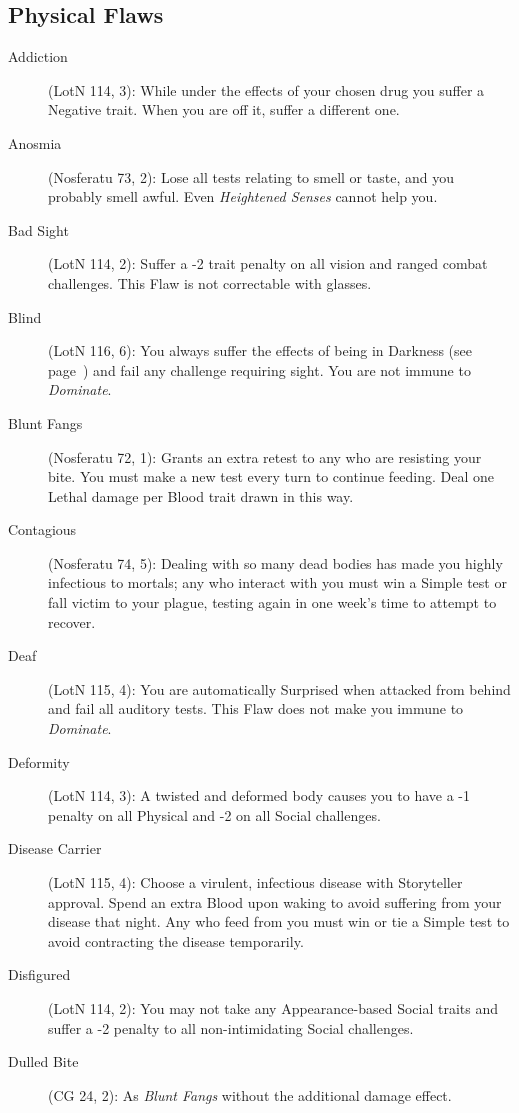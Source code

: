\subsection{Physical Flaws}
\begin{description}
	\item[Addiction] (LotN 114, 3):  While under the effects of your chosen drug you 
	suffer a Negative trait.  When you are off it, suffer a different one.
	\item[Anosmia] (Nosferatu 73, 2):  Lose all tests relating to smell or taste, and 
	you probably smell awful.  Even \emph{Heightened Senses} cannot help you.
	\item[Bad Sight] (LotN 114, 2):  Suffer a -2 trait penalty on all vision and ranged 
	combat challenges.  This Flaw is not correctable with glasses.
	\item[Blind] (LotN 116, 6):  You always suffer the effects of being in Darkness (see 
	page~\pageref{sec:challenges}) and fail any challenge requiring sight.  You are not 
	immune to \emph{Dominate}.
	\item[Blunt Fangs] (Nosferatu 72, 1):  Grants an extra retest to any who are resisting your 
	bite.  You must make a new test every turn to continue feeding.  Deal one Lethal damage per 
	Blood trait drawn in this way.
	\item[Contagious] (Nosferatu 74, 5):  Dealing with so many dead bodies has made you 
	highly infectious to mortals; any who interact with you must win a Simple test or fall 
	victim to your plague, testing again in one week's time to attempt to recover.
	\item[Deaf] (LotN 115, 4):  You are automatically Surprised when attacked from behind 
	and fail all auditory tests.  This Flaw does not make you immune to \emph{Dominate}.
	\item[Deformity] (LotN 114, 3):  A twisted and deformed body causes you to have a -1 
	penalty on all Physical and -2 on all Social challenges.
	\item[Disease Carrier] (LotN 115, 4):  Choose a virulent, infectious disease with 
	Storyteller approval.  Spend an extra Blood upon waking to avoid suffering from your 
	disease that night.  Any who feed from you must win or tie a Simple test to avoid 
	contracting the disease temporarily.
	\item[Disfigured] (LotN 114, 2):  You may not take any Appearance-based Social traits 
	and suffer a -2 penalty to all non-intimidating Social challenges.
	\item[Dulled Bite] (CG 24, 2):  As \emph{Blunt Fangs} without the additional damage effect.

\end{description}
